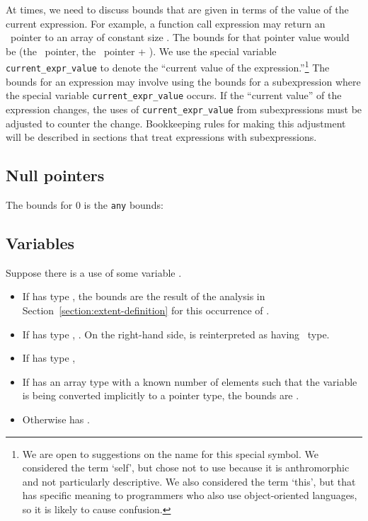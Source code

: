 At times, we need to discuss bounds that are given in terms of the value
of the current expression. For example, a function call expression may
return an \arrayptr\ pointer to an array of constant size
. The bounds for that pointer value would be (the
\arrayptr\ pointer, the \arrayptr\ pointer +
). We use the special variable \texttt{current\_expr\_value} to
denote the ``current value of the expression.''\footnote{We are open to
  suggestions on the name for this special symbol. We considered the
  term `self', but chose not to use because it is anthromorphic and not
  particularly descriptive. We also considered the term `this', but that
  has specific meaning to programmers who also use object-oriented
  languages, so it is likely to cause confusion.} The bounds for an
expression may involve using the bounds for a subexpression where the
special variable \texttt{current\_expr\_value} occurs. If the ``current
value'' of the expression changes, the uses of
\texttt{current\_expr\_value} from subexpressions must be adjusted to
counter the change. Bookkeeping rules for making this adjustment will be
described in sections that treat expressions with subexpressions.

\subsection{Null pointers}
\label{null-pointers}

The bounds for 0 is the \texttt{any} bounds:


\subsection{Variables}
\label{section:checking-variables}

Suppose there is a use of some variable .

\begin{itemize}
\item
  If  has type \arrayptr, the bounds are the result of
  the analysis in Section~\ref{section:extent-definition}
  for this occurrence of .
\item
  If  has type \ptrT, 
  .
   On the right-hand side,  is reinterpreted as having \arrayptr\ type.
\item
  If  has type
  \arrayviewT, 
\item
  If  has an array type with a known number of elements 
  such that the variable is being converted implicitly to a pointer
  type, the bounds are  .
\item
  Otherwise  has \boundsnone.
\end{itemize}



